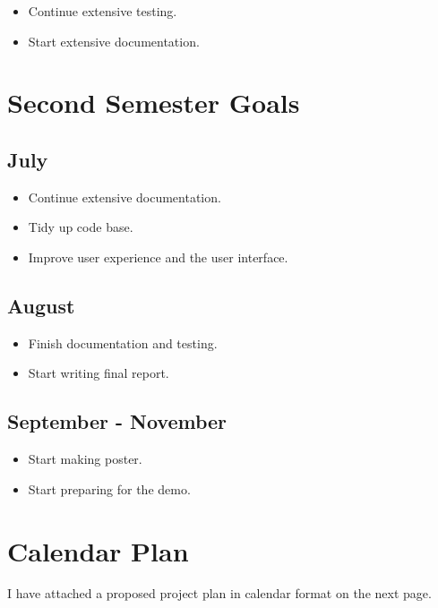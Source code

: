 \documentclass[a4paper, 12pt]{article}
\begin{document}
\begin{itemize}
	\item Continue extensive testing.
	\item Start extensive documentation.
\end{itemize}

\section{Second Semester Goals}

\subsection{July}

\begin{itemize}
	\item Continue extensive documentation.
	\item Tidy up code base.
	\item Improve user experience and the user interface.
\end{itemize}

\subsection{August}

\begin{itemize}
	\item Finish documentation and testing.
	\item Start writing final report.
\end{itemize}

\subsection{September - November}

\begin{itemize}
	\item Start making poster.
	\item Start preparing for the demo.
\end{itemize}

\section*{Calendar Plan}

I have attached a proposed project plan in calendar format on the next page.
\end{document}
